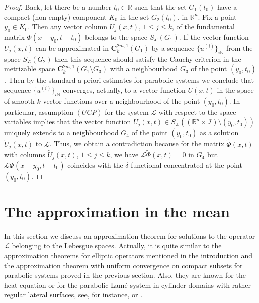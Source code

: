 \documentclass{amsart}
\theoremstyle{definition}
\theoremstyle{remark}
\numberwithin{equation}{section}
\begin{document}
\begin{proof}
Back, let there be a number $t_0\in \mathbb R$ such that the set  $G_1 (t_0) $   
have a compact (non-empty) component $K_0$ in the set $G_2 (t_0)$. 
in ${\mathbb R}^n$. Fix a point $y_0 \in K_0$. 
Then any vector column $U_j (x,t)$, $1\leq j \leq k$, 
of the fundamental matrix $\Phi (x-y_0, t-t_0)$ 
belongs to the space $S_{\mathcal L} (G_1)$. If the vector function 
$U_j (x,t)$ can be approximated in ${\mathbf C}^{2m,1}_k  (G_1)$ 
by a sequence $\{ u^{(i)} \}_{i \mathbb N}$ from the space $S_{\mathcal L} (G_2)$ 
then this sequence should satisfy the Cauchy criterion in the metrizable space 
${\mathbf C}^{2m,1}_k  (G_1 \setminus G_3) $ with a neighbourhood $G_3$ of the 
point $(y_0, t_0)$. Then by the standard a priori estimates for parabolic systems we conclude 
that sequence $\{ u^{(i)} \}_{i \mathbb N}$ converges, actually, to a vector 
function $U(x,t)$ in the space of smooth $k$-vector functions over a neighbourhood 
of the point $(y_0,t_0)$. In particular, assumption $(UCP)$ for the system ${\mathcal L}$ 
with respect to the space variables implies that the vector function $U_j (x,t) \in 
S_{\mathcal L} (({\mathbb R}^n \times \mathcal{I})\setminus (y_0,t_0))$ uniquely extends to a 
neighbourhood $G_4$ of the point $(y_0,t_0)$ as a solution $\tilde U_j (x,t)$ to 
${\mathcal L}$. Thus, we obtain a contradiction because for the matrix $\tilde \Phi (x,t)$
with columns $\tilde U_j (x,t)$, $1\leq j \leq k$, we have ${\mathcal L}\tilde \Phi (x,t) =0$ 
in $G_4$   but ${\mathcal L} \Phi  (x-y_0,t-t_0)$ coincides with the $\delta$-functional 
concentrated at the point $(y_0,t_0)$. 
\end{proof}

\section{The approximation in the mean}
\label{s.2}

In this section we discuss an approximation theorem for solutions to the operator 
$\mathcal L$ belonging to the Lebesgue spaces. Actually, it is quite similar to the 
approximation theorems for elliptic operators mentioned in the introduction and 
the approximation theorem with uniform convergence on compact subsets for parabolic systems 
proved in the previous section. Also, they are known for the heat equation or for the 
parabolic Lam\'e system in cylinder domains with rather regular lateral surfaces, 
see, for instance,  \cite{ShHeat} or \cite{VKShLame}. 
\end{document}

